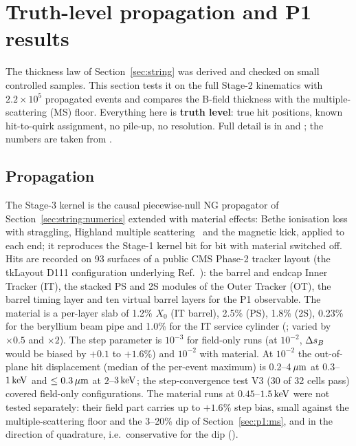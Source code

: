 \section{Truth-level propagation and P1 results}\label{sec:p1}

The thickness law of Section~\ref{sec:string} was derived and checked on small controlled samples. This section tests it
on the full Stage-2 kinematics with $2.2\times10^5$ propagated events and compares the B-field thickness with the
multiple-scattering (MS) floor. Everything here is \textbf{truth level}: true hit positions, known hit-to-quirk assignment,
no pile-up, no resolution. Full detail is in  and ; the numbers
are taken from .

\subsection{Propagation}\label{sec:p1:prop}
The Stage-3 kernel is the causal piecewise-null NG propagator of Section~\ref{sec:string:numerics} extended with
material effects: Bethe ionisation loss with straggling, Highland multiple scattering~\cite{Highland:1975pq} and the
magnetic kick, applied to each end; it reproduces the Stage-1 kernel bit for bit with material switched off. Hits are
recorded on 93 surfaces of a public CMS Phase-2 tracker layout (the tkLayout D111 configuration underlying
Ref.~\cite{CMS:2017lum}): the barrel and endcap Inner Tracker (IT), the stacked PS and 2S modules of the Outer Tracker
(OT), the barrel timing layer and ten virtual barrel layers for the P1 observable. The material is a per-layer slab of
1.2\% $X_0$ (IT barrel), 2.5\% (PS), 1.8\% (2S), 0.23\% for the beryllium beam pipe and 1.0\% for the IT service
cylinder (\UNV{}; varied by $\times0.5$ and $\times2$). The step parameter is $10^{-3}$ for field-only runs (at $10^{-2}$, $\Delta s_B$ would be biased
by $+0.1$ to $+1.6\%$) and $10^{-2}$ with material. At $10^{-2}$ the out-of-plane hit displacement (median of the
per-event maximum) is 0.2--4$\,\mu\mathrm{m}$ at $0.3$--$1\,\mathrm{keV}$ and $\le0.3\,\mu\mathrm{m}$ at $2$--$3\,\mathrm{keV}$; the step-convergence test V3 (30
of 32 cells pass) covered field-only configurations. The material runs at $0.45$--$1.5\,\mathrm{keV}$ were not tested separately:
their field part carries up to $+1.6\%$ step bias, small against the multiple-scattering floor and the 3--20\% dip of
Section~\ref{sec:p1:ms}, and in the direction of quadrature, i.e.\ conservative for the dip (\EST{}).

